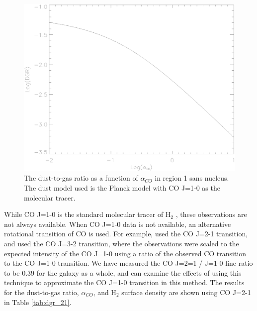 \begin{figure}
  \centering
  \includegraphics[width=1.\textwidth]{dgr_imgs/region_1-3_aco_dgr.eps}
  \caption[Mean Dust-to-Gas Ratio vs $\alpha_{CO}$]{The dust-to-gas ratio as a function of $\alpha_{CO}$ in region 1 sans nucleus.  The dust model used is the Planck model with CO J=1-0 as the molecular tracer.}
  \label{fig:aco_dgr}
\end{figure}

While CO J=1-0 is the standard molecular tracer of H$_2$ \citep{bolatto2013}, these observations are not always available.  When CO J=1-0 data is not available, an alternative rotational transition of CO is used.  For example, \cite{sandstrom2013} used the CO J=2-1 transition, and \cite{warren2010} used the CO J=3-2 transition, where the observations were scaled to the expected intensity of the CO J=1-0 using a ratio of the observed CO transition to the CO J=1-0 transition.  We have measured the CO J=2=1 / J=1-0 line ratio to be 0.39 for the galaxy as a whole, and can examine the effects of using this technique to approximate the CO J=1-0 transition in this method.  The results for the dust-to-gas ratio, $\alpha_{CO}$, and H$_2$ surface density are shown using CO J=2-1 in Table \ref{tab:dgr_21}.

